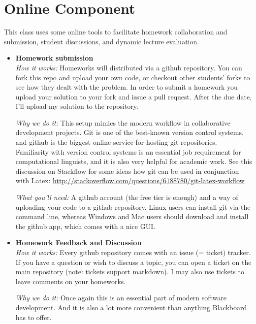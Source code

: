 \section{Online Component}

This class uses some online tools to facilitate homework collaboration and submission, student discussions, and dynamic lecture evaluation.

\begin{itemize}
    \item \textbf{Homework submission}\\
        \emph{How it works:}
        Homeworks will distributed via a github repository. 
        You can fork this repo and upload your own code, or checkout other students' forks to see how they dealt with the problem.
        In order to submit a homework you upload your solution to your fork and issue a pull request.
        After the due date, I'll upload my solution to the repository.

        \emph{Why we do it:}
        This setup mimics the modern workflow in collaborative development projects.
        Git is one of the best-known version control systems, and github is the biggest online service for hosting git repositories.
        Familiarity with version control systems is an essential job requirement for computational linguists, and it is also very helpful for academic work.
        See this discussion on Stackflow for some ideas how git can be used in conjunction with Latex:
        \href{http://stackoverflow.com/questions/6188780/git-latex-workflow}{http://stackoverflow.com/questions/6188780/git-latex-workflow}

        \emph{What you'll need:}
        A github account (the free tier is enough) and a way of uploading your code to a github repository.
        Linux users can install git via the command line, whereas Windows and Mac users should download and install the github app, which comes with a nice GUI.

    \item \textbf{Homework Feedback and Discussion}\\
        \emph{How it works:}
        Every github repository comes with an issue (= ticket) tracker.
        If you have a question or wish to discuss a topic, you can open a ticket on the main repository (note: tickets support markdown).
        I may also use tickets to leave comments on your homeworks.

        \emph{Why we do it:}
        Once again this is an essential part of modern software development.
        And it is also a lot more convenient than anything Blackboard has to offer.


\end{itemize}
